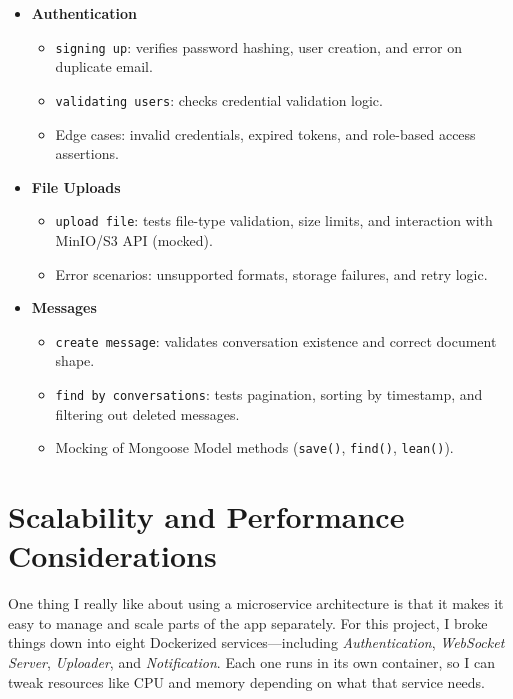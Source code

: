 \begin{itemize}
  \item \textbf{Authentication}
    \begin{itemize}
      \item \texttt{signing up}: verifies password hashing, user creation, and error on duplicate email.
      \item \texttt{validating users}: checks credential validation logic.
      \item Edge cases: invalid credentials, expired tokens, and role-based access assertions.
    \end{itemize}

  \item \textbf{File Uploads}
    \begin{itemize}
      \item \texttt{upload file}: tests file-type validation, size limits, and interaction with MinIO/S3 API (mocked).
      \item Error scenarios: unsupported formats, storage failures, and retry logic.
    \end{itemize}

  \item \textbf{Messages}
    \begin{itemize}
      \item \texttt{create message}: validates conversation existence and correct document shape.
      \item \texttt{find by conversations}: tests pagination, sorting by timestamp, and filtering out deleted messages.
      \item Mocking of Mongoose Model methods (\texttt{save()}, \texttt{find()}, \texttt{lean()}).
    \end{itemize}
\end{itemize}

\section{Scalability and Performance Considerations}

One thing I really like about using a microservice architecture is that it makes it easy to manage and scale parts of the app separately. For this project, I broke things down into eight Dockerized services---including \emph{Authentication}, \emph{WebSocket Server}, \emph{Uploader}, and \emph{Notification}. Each one runs in its own container, so I can tweak resources like CPU and memory depending on what that service needs.

